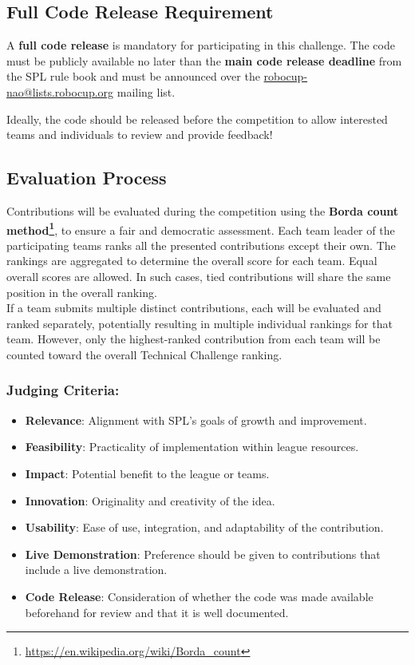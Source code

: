 \subsection{Full Code Release Requirement}
A \textbf{full code release} is mandatory for participating in this challenge. The code must be publicly available no later than the \textbf{main code release deadline} from the SPL rule book and must be announced over the \url{robocup-nao@lists.robocup.org} mailing list.

Ideally, the code should be released before the competition to allow interested teams and individuals to review and provide feedback!



\subsection{Evaluation Process}
Contributions will be evaluated during the competition using the \textbf{Borda count method\footnote{\url{https://en.wikipedia.org/wiki/Borda_count}}}, to ensure a fair and democratic assessment. Each team leader of the participating teams ranks all the presented contributions except their own. The rankings are aggregated to determine the overall score for each team. Equal overall scores are allowed. In such cases, tied contributions will share the same position in the overall ranking.\\
If a team submits multiple distinct contributions, each will be evaluated and ranked separately, potentially resulting in multiple individual rankings for that team.
However, only the highest-ranked contribution from each team will be counted toward the overall Technical Challenge ranking.

\subsubsection*{Judging Criteria:}
\begin{itemize}
    \item \textbf{Relevance}: Alignment with SPL’s goals of growth and improvement.
    \item \textbf{Feasibility}: Practicality of implementation within league resources.
    \item \textbf{Impact}: Potential benefit to the league or teams.
    \item \textbf{Innovation}: Originality and creativity of the idea.
    \item \textbf{Usability}: Ease of use, integration, and adaptability of the contribution.
    \item \textbf{Live Demonstration}: Preference should be given to contributions that include a live demonstration.
    \item \textbf{Code Release}: Consideration of whether the code was made available beforehand for review and that it is well documented.
\end{itemize}

